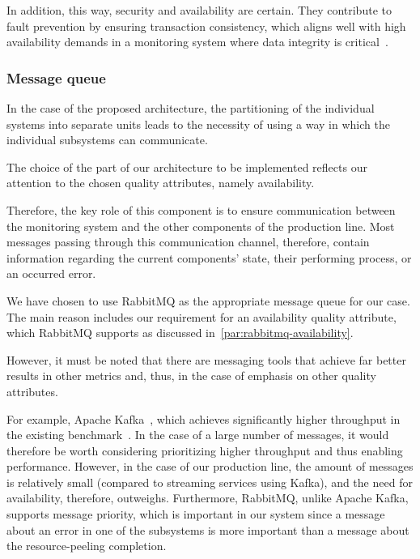 \documentclass[conference]{IEEEtran}
\begin{document}
In addition, this way, security and availability are certain. They contribute to fault prevention by ensuring transaction consistency, which aligns well with high availability demands in a monitoring system where data integrity is critical~\cite{b1}.

\subsubsection{Message queue}
In the case of the proposed architecture, the partitioning of the individual systems into separate units leads to the necessity of using a way in which the individual subsystems can communicate.

The choice of the part of our architecture to be implemented reflects our attention to the chosen quality attributes, namely availability.

Therefore, the key role of this component is to ensure communication between the monitoring system and the other components of the production line. Most messages passing through this communication channel, therefore, contain information regarding the current components' state, their performing process, or an occurred error. 

We have chosen to use RabbitMQ as the appropriate message queue for our case. The main reason includes our requirement for an availability quality attribute, which RabbitMQ supports as discussed in~\ref{par:rabbitmq-availability}.

However, it must be noted that there are messaging tools that achieve far better results in other metrics and, thus, in the case of emphasis on other quality attributes.

For example, Apache Kafka~\cite{garg2013apache}, which achieves significantly higher throughput in the existing benchmark~\cite{Fu2020Dec}. In the case of a large number of messages, it would therefore be worth considering prioritizing higher throughput and thus enabling performance. However, in the case of our production line, the amount of messages is relatively small (compared to streaming services using Kafka), and the need for availability, therefore, outweighs.
Furthermore, RabbitMQ, unlike Apache Kafka, supports message priority, which is important in our system since a message about an error in one of the subsystems is more important than a message about the resource-peeling completion.


\end{document}
